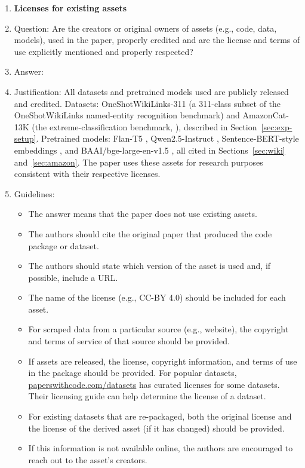 \documentclass{article}
\theoremstyle{definition}
\theoremstyle{remark}
\theoremstyle{remark}
\begin{document}
\begin{enumerate}
\item {\bf Licenses for existing assets}
    \item[] Question: Are the creators or original owners of assets (e.g., code, data, models), used in the paper, properly credited and are the license and terms of use explicitly mentioned and properly respected?
    \item[] Answer: \answerYes{} %
    \item[] Justification: All datasets and pretrained models used are publicly released and credited. Datasets: OneShotWikiLinks-311 (a 311-class subset of the OneShotWikiLinks named-entity recognition benchmark) and AmazonCat-13K (the extreme-classification benchmark, \cite{bhatia2016extreme}), described in Section~\ref{sec:exp-setup}. Pretrained models: Flan-T5 \cite{chung2024scaling}, Qwen2.5-Instruct \cite{hui2024qwen2}, Sentence-BERT-style embeddings \cite{reimers2019sentence}, and BAAI/bge-large-en-v1.5 \cite{xiao2024c}, all cited in Sections~\ref{sec:wiki} and~\ref{sec:amazon}. The paper uses these assets for research purposes consistent with their respective licenses.
    \item[] Guidelines:
    \begin{itemize}
        \item The answer \answerNA{} means that the paper does not use existing assets.
        \item The authors should cite the original paper that produced the code package or dataset.
        \item The authors should state which version of the asset is used and, if possible, include a URL.
        \item The name of the license (e.g., CC-BY 4.0) should be included for each asset.
        \item For scraped data from a particular source (e.g., website), the copyright and terms of service of that source should be provided.
        \item If assets are released, the license, copyright information, and terms of use in the package should be provided. For popular datasets, \url{paperswithcode.com/datasets} has curated licenses for some datasets. Their licensing guide can help determine the license of a dataset.
        \item For existing datasets that are re-packaged, both the original license and the license of the derived asset (if it has changed) should be provided.
        \item If this information is not available online, the authors are encouraged to reach out to the asset's creators.
    \end{itemize}


\end{enumerate}
\end{document}
